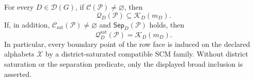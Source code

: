 For every \(D\in\mathcal D(G)\), if \(\mathcal C(\mathcal P)\ne\varnothing\), then
\[
\mathcal Q_D(\mathcal P)\subseteq\mathcal K_D(m_D).
\]
If, in addition, \(\mathcal C_{\mathrm{sat}}(\mathcal P)\ne\varnothing\) and \(\mathsf{Sep}_D(\mathcal P)\) holds, then
\[
\mathcal Q_D^{\mathrm{sat}}(\mathcal P)=\mathcal K_D(m_D).
\]
In particular, every boundary point of the row face is induced on the declared alphabets \(\mathcal X\) by a district-saturated compatible SCM family. Without district saturation or the separation predicate, only the displayed broad inclusion is asserted.
